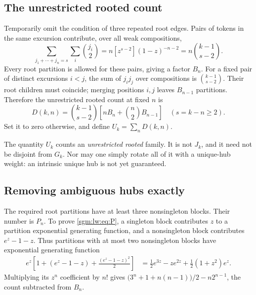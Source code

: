 \documentclass[11pt,letterpaper]{article}
\theoremstyle{remark}\newtheorem{remark}[theorem]{Remark}
\theoremstyle{definition}\newtheorem{definition}[theorem]{Definition}
\begin{document}
\subsection{The unrestricted rooted count}
Temporarily omit the condition of three repeated root edges. Pairs of tokens in the same excursion contribute, over all weak compositions,
\[
 \sum_{j_1+\cdots+j_n=s}\sum_i\binom{j_i}{2}
 =n[z^{s-2}](1-z)^{-n-2}
 =n\binom{k-1}{s-2}.
\]
Every root partition is allowed for these pairs, giving a factor $B_n$. For a fixed pair of distinct excursions $i<j$, the sum of $j_i j_j$ over compositions is $\binom{k-1}{s-2}$. Their root children must coincide; merging positions $i,j$ leaves $B_{n-1}$ partitions. Therefore the unrestricted rooted count at fixed $n$ is
\begin{equation}\label{sgm:lw:eq:D}
 D(k,n)=\binom{k-1}{s-2}
          \left[nB_n+\binom n2B_{n-1}\right]
 \quad(s=k-n\ge2).
\end{equation}
Set it to zero otherwise, and define $U_k=\sum_nD(k,n)$.

The quantity $U_k$ counts an \emph{unrestricted rooted} family. It is not $J_k$, and it need not be disjoint from $G_k$. Nor may one simply rotate all of it with a unique-hub weight: an intrinsic unique hub is not yet guaranteed.

\subsection{Removing ambiguous hubs exactly}
The required root partitions have at least three nonsingleton blocks. Their number is $P_n$. To prove \eqref{sgm:lw:eq:P}, a singleton block contributes $z$ to a partition exponential generating function, and a nonsingleton block contributes $e^z-1-z$. Thus partitions with at most two nonsingleton blocks have exponential generating function
\begin{align*}
 e^z\left[1+(e^z-1-z)+\frac{(e^z-1-z)^2}{2}\right]
 &=\frac12e^{3z}-ze^{2z}+\frac12(1+z^2)e^z.
\end{align*}
Multiplying its $z^n$ coefficient by $n!$ gives
$\bigl(3^n+1+n(n-1)\bigr)/2-n2^{n-1}$, the count subtracted from $B_n$.
\end{document}
